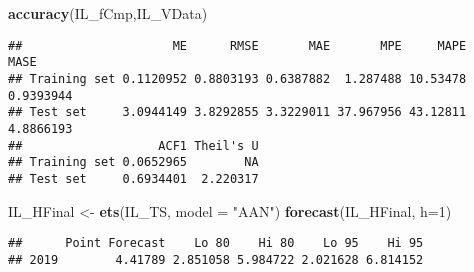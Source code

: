 \documentclass[
]{article}
\newenvironment{Shaded}{\begin{snugshade}}{\end{snugshade}}
\newcommand{\CommentTok}[1]{\textcolor[rgb]{0.56,0.35,0.01}{\textit{#1}}}
\newcommand{\DataTypeTok}[1]{\textcolor[rgb]{0.13,0.29,0.53}{#1}}
\newcommand{\DecValTok}[1]{\textcolor[rgb]{0.00,0.00,0.81}{#1}}
\newcommand{\KeywordTok}[1]{\textcolor[rgb]{0.13,0.29,0.53}{\textbf{#1}}}
\newcommand{\NormalTok}[1]{#1}
\newcommand{\OperatorTok}[1]{\textcolor[rgb]{0.81,0.36,0.00}{\textbf{#1}}}
\newcommand{\StringTok}[1]{\textcolor[rgb]{0.31,0.60,0.02}{#1}}
\begin{document}
\begin{Shaded}
\begin{Highlighting}[]
\KeywordTok{accuracy}\NormalTok{(IL_fCmp,IL_VData)}
\end{Highlighting}
\end{Shaded}

\begin{verbatim}
##                     ME      RMSE       MAE       MPE     MAPE      MASE
## Training set 0.1120952 0.8803193 0.6387882  1.287488 10.53478 0.9393944
## Test set     3.0944149 3.8292855 3.3229011 37.967956 43.12811 4.8866193
##                   ACF1 Theil's U
## Training set 0.0652965        NA
## Test set     0.6934401  2.220317
\end{verbatim}

\begin{Shaded}
\begin{Highlighting}[]
\NormalTok{IL_HFinal <-}\StringTok{ }\KeywordTok{ets}\NormalTok{(IL_TS, }\DataTypeTok{model =} \StringTok{"AAN"}\NormalTok{)}
\KeywordTok{forecast}\NormalTok{(IL_HFinal, }\DataTypeTok{h=}\DecValTok{1}\NormalTok{)}
\end{Highlighting}
\end{Shaded}

\begin{verbatim}
##      Point Forecast    Lo 80    Hi 80    Lo 95    Hi 95
## 2019        4.41789 2.851058 5.984722 2.021628 6.814152
\end{verbatim}

\begin{Shaded}
\end{Shaded}
\end{document}

